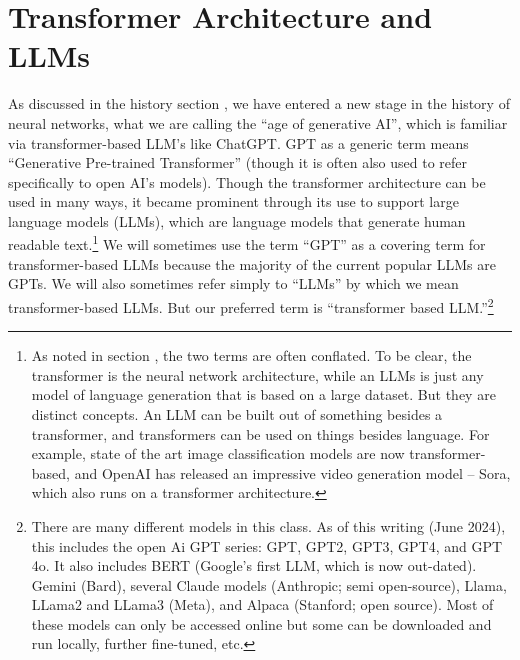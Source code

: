 \chapter{Transformer Architecture and LLMs}\label{ch_transformers}


As discussed in the history section , we have entered a new stage in the history of neural networks, what we are calling the ``age of generative AI'', which is familiar via transformer-based LLM's like ChatGPT.  GPT as a generic term means “Generative Pre-trained Transformer” (though it is often also used to refer specifically to open AI’s models). Though the transformer architecture can be used in many ways, it became prominent through its use to support large language models (LLMs), which are language models that generate human readable text.\footnote{As noted in section , the two terms are often conflated. To be clear, the transformer is the neural network architecture, while an LLMs is just any model of language generation that is based on a large dataset.  But they are distinct concepts. An LLM can be built out of something besides a transformer, and transformers can be used on things besides language. For example, state of the art image classification models are now transformer-based, and OpenAI has released an impressive video generation model – Sora, which also runs on a transformer architecture.} We will sometimes use the term ``GPT'' as a covering term for transformer-based LLMs because the majority of the current popular LLMs are GPTs.  We will also sometimes refer simply to ``LLMs'' by which we mean transformer-based LLMs. But our preferred term is ``transformer based LLM.''\footnote{There are many different models in this class. As of this writing (June 2024), this includes the open Ai GPT series: GPT, GPT2, GPT3, GPT4, and GPT 4o.  It also  includes BERT (Google’s first LLM, which is now out-dated). Gemini  (Bard), several Claude models (Anthropic;  semi open-source), Llama, LLama2 and LLama3 (Meta), and Alpaca (Stanford; open source). Most of these models can only be accessed online but some can be downloaded and run locally, further fine-tuned, etc.}

